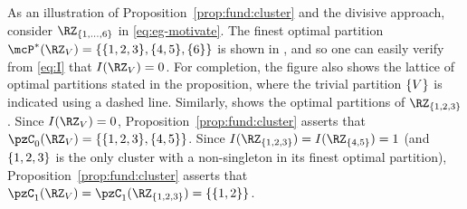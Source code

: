 \begin{example}
	\label{eg:divisive}
	As an illustration of Proposition~\ref{prop:fund:cluster} and the divisive approach, consider
	$\RZ_{\{1,\dots,6\}}$ in \eqref{eq:eg-motivate}.
	The finest optimal partition
	$\mcP^{*}(\RZ_V) = \Set{\Set{1,2,3},\Set{4,5},\Set{6}}$ is shown in , and
	so one can easily verify from \eqref{eq:I} that $I(\RZ_{V}) = 0$.
	For completion, the figure also shows the lattice of optimal partitions stated in the proposition,
	where the trivial partition $\{V\}$ is indicated using a dashed line.
	Similarly,  shows the optimal partitions of
	$\RZ_{\Set{1,2,3}}$.
	Since $I(\RZ_{V}) = 0$, Proposition~\ref{prop:fund:cluster}
	asserts that $\pzC_{0}(\RZ_V) = \Set{\Set{1,2,3},\Set{4,5}}$.
	Since $I(\RZ_{\Set{1,2,3}}) =I(\RZ_{\Set{4,5}})=1$ (and $\{1,2,3\}$
	is the only cluster
	with a non-singleton in its finest optimal partition),
	Proposition~\ref{prop:fund:cluster} asserts that
	$\pzC_{1}(\RZ_V)=\pzC_1(\RZ_{\Set {1,2,3}}) = \Set{\Set{1,2}}$. 


\end{example}
